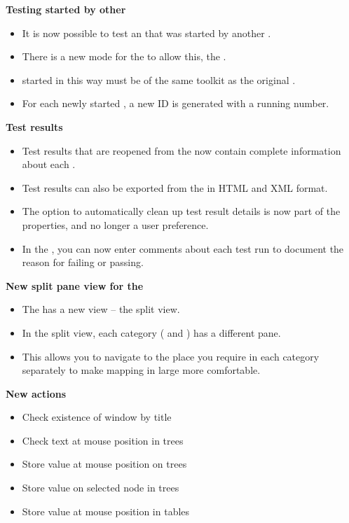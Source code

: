 \textbf{Testing \gdauts{} started by other \gdauts{}}
\begin{itemize}
\item It is now possible to test an \gdaut{} that was started by another \gdaut{}. 
\item There is a new mode for the \gdagent{} to allow this, the .
\item \gdauts{} started in this way must be of the same toolkit as the original \gdaut{}.
\item For each newly started \gdaut{}, a new \gdaut{} ID is generated with a running number. 
\end{itemize}
\textbf{Test results}
\begin{itemize}
\item Test results that are reopened from the \gdtestsummaryview{} now contain complete information about each \gdstep{}.
\item Test results can also be exported from the \gdtestsummaryview{} in HTML and XML format.
\item The option to automatically clean up test result details is now part of the \gdproject{} properties, and no longer a user preference.
\item In the \gdtestsummaryview{}, you can now enter comments about each test run to document the reason for failing or passing. 
\end{itemize}
\textbf{New split pane view for the \gdomeditor{}}
\begin{itemize}
\item The \gdomeditor{} has a new view -- the split view.
\item In the split view, each category ( and ) has a different pane.
\item This allows you to navigate to the place you require in each category separately to make mapping in large \gdprojects{} more comfortable.
\end{itemize}
\textbf{New actions}
\begin{itemize}
\item Check existence of window by title
\item Check text at mouse position in trees
\item Store value at mouse position on trees
\item Store value on selected node in trees
\item Store value at mouse position in tables
\end{itemize}

